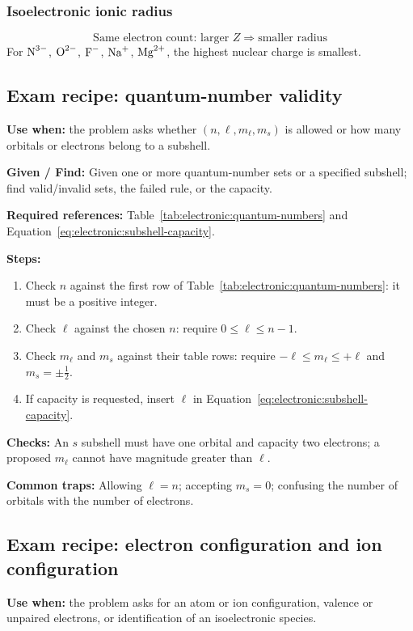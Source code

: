 \subsubsection{Isoelectronic ionic radius}
\begin{equation}
\text{Same electron count: larger }Z\Rightarrow\text{smaller radius}
\label{eq:electronic:isoelectronic-radius}
\end{equation}
For \(\ce{N^3-}\), \(\ce{O^2-}\), \(\ce{F-}\), \(\ce{Na+}\), \(\ce{Mg^2+}\), the highest nuclear charge is smallest.

\subsection{Exam recipe: quantum-number validity}
\textbf{Use when:} the problem asks whether \((n,\ell,m_\ell,m_s)\) is allowed or how many orbitals or electrons belong to a subshell.

\textbf{Given / Find:} Given one or more quantum-number sets or a specified subshell; find valid/invalid sets, the failed rule, or the capacity.

\textbf{Required references:} Table~\ref{tab:electronic:quantum-numbers} and Equation~\eqref{eq:electronic:subshell-capacity}.

\textbf{Steps:}
\begin{enumerate}
    \item Check \(n\) against the first row of Table~\ref{tab:electronic:quantum-numbers}: it must be a positive integer.
    \item Check \(\ell\) against the chosen \(n\): require \(0\leq\ell\leq n-1\).
    \item Check \(m_\ell\) and \(m_s\) against their table rows: require \(-\ell\leq m_\ell\leq+\ell\) and \(m_s=\pm\tfrac12\).
    \item If capacity is requested, insert \(\ell\) in Equation~\eqref{eq:electronic:subshell-capacity}.
\end{enumerate}

\textbf{Checks:} An \(s\) subshell must have one orbital and capacity two electrons; a proposed \(m_\ell\) cannot have magnitude greater than \(\ell\).

\textbf{Common traps:} Allowing \(\ell=n\); accepting \(m_s=0\); confusing the number of orbitals with the number of electrons.

\subsection{Exam recipe: electron configuration and ion configuration}
\textbf{Use when:} the problem asks for an atom or ion configuration, valence or unpaired electrons, or identification of an isoelectronic species.

